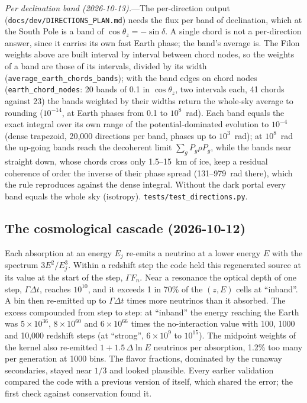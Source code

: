 \documentclass[11pt,a4paper]{article}
\newcommand{\file}[1]{\nolinkurl{#1}}
\begin{document}
\textit{Per declination band (2026-10-13).}---The per-direction output
(\file{docs/dev/DIRECTIONS_PLAN.md}) needs the flux per band of declination, which at the South Pole
is a band of $\cos\theta_z = -\sin\delta$. A single chord is not a per-direction answer, since it
carries its own fast Earth phase; the band's average is. The Filon weights above are built interval
by interval between chord nodes, so the weights of a band are those of its intervals, divided by its
width (\file{average_earth_chords_bands}); with the band edges on chord nodes
(\file{earth_chord_nodes}: 20 bands of 0.1 in $\cos\theta_z$, two intervals each, 41 chords against 23)
the bands weighted by their widths return the whole-sky average to rounding ($10^{-14}$, at Earth
phases from 0.1 to $10^8$~rad). Each band equals the exact integral over its own range of the
potential-dominated evolution to $10^{-4}$ (dense trapezoid, 20,000 directions per band, phases up to
$10^3$~rad); at $10^8$~rad the up-going bands reach the decoherent limit $\sum_g P_g\rho P_g$, while
the bands near straight down, whose chords cross only 1.5--15~km of ice, keep a residual coherence
of order the inverse of their phase spread (131--979~rad there), which the rule reproduces against
the dense integral. Without the dark portal every band equals the whole sky (isotropy).
\file{tests/test_directions.py}.

\subsection{The cosmological cascade (2026-10-12)}
\label{app:cascade}

Each absorption at an energy $E_j$ re-emits a neutrino at a lower energy $E$ with the spectrum
$3E^2/E_j^3$. Within a redshift step the code held this regenerated source at its value at the
start of the step, $\Gamma F_n$. Near a resonance the optical depth of one step, $\Gamma\Delta t$,
reaches $10^{10}$, and it exceeds 1 in 70\% of the $(z,E)$ cells at ``inband''. A bin then
re-emitted up to $\Gamma\Delta t$ times more neutrinos than it absorbed. The excess
compounded from step to step: at ``inband'' the energy reaching the Earth was
$5\times10^{36}$, $8\times10^{60}$ and $6\times10^{66}$ times the no-interaction value with 100,
1000 and 10,000 redshift steps (at ``strong'', $6\times10^{9}$ to $10^{15}$). The midpoint weights
of the kernel also re-emitted $1 + 1.5\,\Delta\ln E$ neutrinos per absorption, 1.2\% too many per
generation at 1000 bins. The flavor fractions, dominated by the runaway secondaries, stayed near
$1/3$ and looked plausible. Every earlier validation compared the code with a previous version of
itself, which shared the error; the first check against conservation found it.
\end{document}
